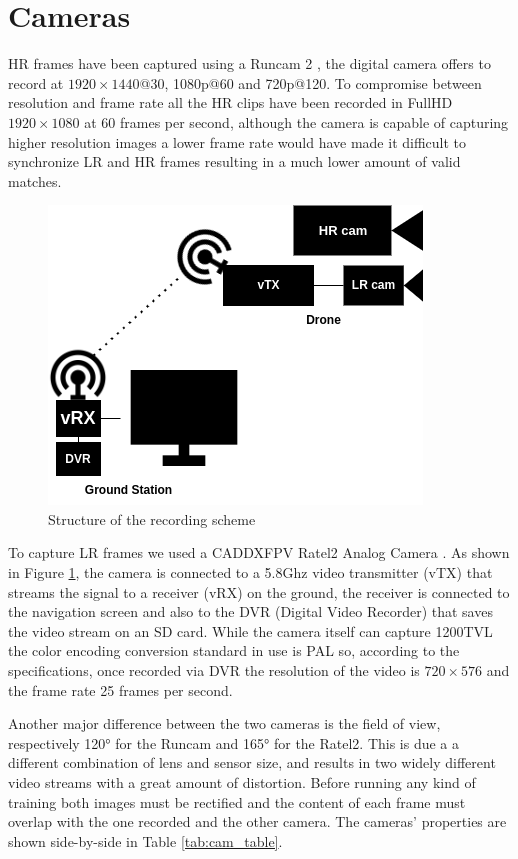 \section{Cameras}
\label{sec:cameras}

HR frames have been captured using a Runcam 2 \cite{runcam}, the digital camera offers to record at \(1920\times1440\)@30, 1080p@60 and 720p@120. To compromise between resolution and frame rate all the HR clips have been recorded in FullHD  \(1920\times1080\) at 60 frames per second, although the camera is capable of capturing higher resolution images a lower frame rate would have made it difficult to synchronize LR and HR frames resulting in a much lower amount of valid matches.
\begin{figure}[H]
  \centering
  \includegraphics[scale=0.5]{figures/recording_schematics_2.png}
  \caption{Structure of the recording scheme}
  \label{img:recordin_schematics}
\end{figure}
To capture LR frames we used a CADDXFPV Ratel2 Analog Camera \cite{caddx}. As shown in Figure \ref{img:recordin_schematics}, the camera is connected to a 5.8Ghz video transmitter (vTX) that streams the signal to a receiver (vRX) on the ground, the receiver is connected to the navigation screen and also to the DVR (Digital Video Recorder) that saves the video stream on an SD card. While the camera itself can capture 1200TVL the color encoding conversion standard in use is PAL \cite{pal} so, according to the specifications, once recorded via DVR the resolution of the video is  \(720\times576\) and the frame rate 25 frames per second.

Another major difference between the two cameras is the field of view, respectively 120° for the Runcam and 165° for the Ratel2. This is due a a different combination of lens and sensor size, and results in two widely different video streams with a great amount of distortion. Before running any kind of training both images must be rectified and the content of each frame must overlap with the one recorded and the other camera. The cameras' properties are shown side-by-side in Table \ref{tab:cam_table}.






